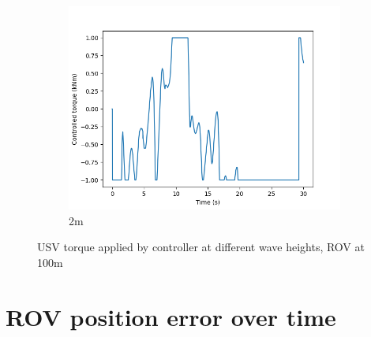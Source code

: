 \documentclass[class=article, crop=false]{standalone}
\begin{document}
\begin{figure}
\begin{subfigure}[b]{0.48\textwidth}
        \includegraphics{scenario1/rov-100m/2.0m/usv_torque}
        \caption{2m}
        \label{}
    \end{subfigure}

    \caption{USV torque applied by controller at different wave heights, ROV at 100m}
\end{figure}


\section{ROV position error over time}
\end{document}
